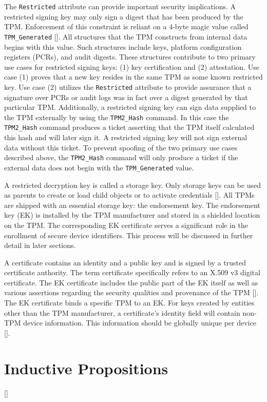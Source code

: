 The \texttt{Restricted} attribute can provide important security implications. A restricted signing key may only sign a digest that has been produced by the TPM. Enforcement of this constraint is reliant on a 4-byte magic value called \texttt{TPM\_Generated} [\cite{TPMSpec}]. All structures that the TPM constructs from internal data begins with this value. Such structures include keys, platform configuration registers (PCRs), and audit digests. These structures contribute to two primary use cases for restricted signing keys: (1) key certification and (2) attestation. Use case (1) proves that a new key resides in the same TPM as some known restricted key. Use case (2) utilizes the \texttt{Restricted} attribute to provide assurance that a signature over PCRs or audit logs was in fact over a digest generated by that particular TPM. Additionally, a restricted signing key can sign data supplied to the TPM externally by using the \texttt{TPM2\_Hash} command. In this case the \texttt{TPM2\_Hash} command produces a ticket asserting that the TPM itself calculated this hash and will later sign it. A restricted signing key will not sign external data without this ticket. To prevent spoofing of the two primary use cases described above, the \texttt{TPM2\_Hash} command will only produce a ticket if the external data does not begin with the \texttt{TPM\_Generated} value.

A restricted decryption key is called a storage key. Only storage keys can be used as parents to create or load child objects or to activate credentials [\cite{PracticalGuide}]. All TPMs are shipped with an essential storage key: the endorsement key. The endorsement key (EK) is installed by the TPM manufacturer and stored in a shielded location on the TPM. The corresponding EK certificate serves a significant role in the enrollment of secure device identifiers. This process will be discussed in further detail in later sections.

A certificate contains an identity and a public key and is signed by a trusted certificate authority. The term certificate specifically refers to an X.509 v3 digital certificate. The EK certificate includes the public part of the EK itself as well as various assertions regarding the security qualities and provenance of the TPM [\cite{EKSpec}]. The EK certificate binds a specific TPM to an EK. For keys created by entities other than the TPM manufacturer, a certificate's identity field will contain non-TPM device information. This information should be globally unique per device [\cite{DevIDSpec-IEEE}].


\section{Inductive Propositions}

[\cite{LogicalFoundations}]